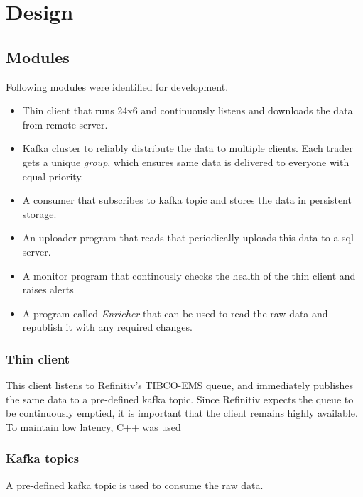 
\chapter{Design} %

\label{Chapter3} %


\section{Modules}
Following modules were identified for development.

\begin{itemize}
	\item Thin client that runs 24x6 and continuously listens and downloads the data from remote server.
	\item Kafka cluster to reliably distribute the data to multiple clients. Each trader gets a unique \emph{group}, which ensures same data is delivered to everyone with equal priority.
	\item A consumer that subscribes to kafka topic and stores the data in persistent storage.
	\item An uploader program that reads that periodically uploads this data to a sql server.
	\item A monitor program that continously checks the health of the thin client and raises alerts
	\item A program called \emph{Enricher} that can be used to read the raw data and republish it with any required changes.
\end{itemize}

\subsection{Thin client}
This client listens to Refinitiv's TIBCO-EMS queue, and immediately publishes the same data to a pre-defined kafka topic. Since Refinitiv expects the queue to be continuously emptied, it is important that the client remains highly available. To maintain low latency, C++ was used

\subsection{Kafka topics}
A pre-defined kafka topic is used to consume the raw data.

